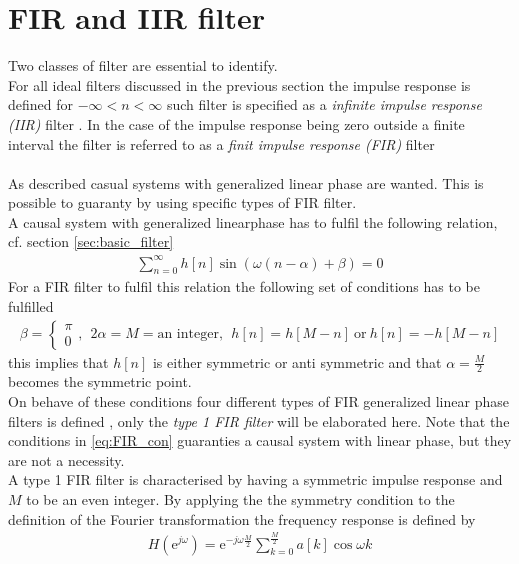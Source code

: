 \section{FIR and IIR filter} 
Two classes of filter are essential to identify.\\
For all ideal filters discussed in the previous section the impulse response is defined for $-\infty < n < \infty$ such filter is specified as a \textit{infinite impulse response (IIR)} filter . In the case of the impulse response being zero outside a finite interval the filter is referred to as a \textit{finit impulse response (FIR)} filter \\
\\
As described casual systems with generalized linear phase are wanted. This is possible to guaranty by using specific types of FIR filter.\\
A causal system with generalized linearphase has to fulfil the following relation, cf. section \ref{sec:basic_filter}
\begin{align}
\sum_{n=0}^{\infty}h[n]\sin\left(\omega \left(n-\alpha \right) + \beta \right) = 0
\end{align}
For a FIR filter to fulfil this relation the following set of conditions has to be fulfilled
\begin{align} \label{eq:FIR_con}
\beta = \left\{ \begin{matrix}
\pi  \\
0 
\end{matrix}\right. , \ \ 2\alpha = M = \text{an integer} , \ \ h[n]=h[M-n] \ \text{or} \ h[n]=-h[M-n]   
\end{align} 
this implies that $h[n]$ is either symmetric or anti symmetric and that $\alpha = \frac{M}{2}$ becomes the symmetric point. \\
On behave of these conditions four different types of FIR generalized linear phase filters is defined \cite{DTSP, p. 343}, only the \textit{type 1 FIR filter} will be elaborated here. Note that the conditions in \eqref{eq:FIR_con} guaranties a causal system with linear phase, but they are not a necessity. \\
A type 1 FIR filter is characterised by having a symmetric impulse response and $M$ to be an even integer. By applying the the symmetry condition to the definition of the Fourier transformation the frequency response is defined by   
\begin{align}\label{eq:type1}
H(\text{e}^{j\omega})=\text{e}^{-j\omega \frac{M}{2}} \sum_{k=0}^{\frac{M}{2}} a[k]\cos \omega k
\end{align}
